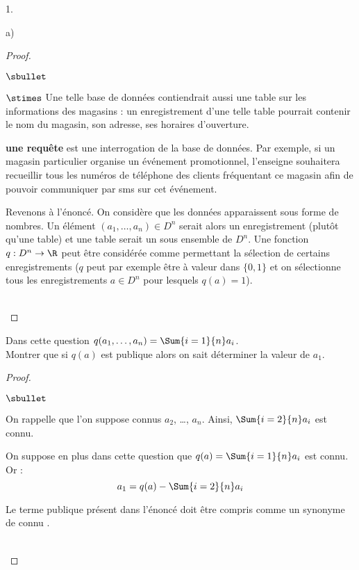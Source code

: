\documentclass[11pt]{article}%
\begin{document}
\begin{noliste}{1.}
\begin{noliste}{a)}
\begin{proof}
\begin{remark}
\begin{noliste}{$\sbullet$}
\begin{noliste}{$\stimes$}
            Une telle base de données contiendrait aussi une table sur
            les informations des magasins : un enregistrement d'une
            telle table pourrait contenir le nom du magasin, son
            adresse, ses horaires d'ouverture.
          \item {\bf une requête} est une interrogation de la base de
            données. Par exemple, si un magasin particulier organise un
            événement promotionnel, l'enseigne
            souhaitera recueillir tous les numéros de téléphone des
            clients fréquentant ce magasin afin de pouvoir
            communiquer par sms sur cet événement.
          \end{noliste}
        \item Revenons à l'énoncé. On considère que les données
          apparaissent sous forme de nombres. Un élément $(a_1,
          \ldots, a_n) \in D^n$ serait alors un enregistrement (plutôt
          qu'une table) et une table serait un sous ensemble de
          $D^n$. Une fonction $q : D^n \to \R$ peut être considérée
          comme permettant la sélection de certains enregistrements
          ($q$ peut par exemple être à valeur dans $\{0, 1\}$ et on
          sélectionne tous les enregistrements $a \in D^n$ pour
          lesquels $q(a) = 1$).
        \end{noliste}
      \end{remark}~\\[-1.4cm]
    \end{proof}


    \newpage


  \item Dans cette question $q(a_1,\ldots,a_n) = \Sum{i=1}{n} a_i$.\\
    Montrer que si $q(a)$ est publique alors on sait déterminer la
    valeur de $a_1$.

    \begin{proof}~%
      \begin{noliste}{$\sbullet$}
      \item On rappelle que l'on suppose connus $a_2$, \ldots,
        $a_n$. Ainsi, $\Sum{i=2}{n} a_i$ est connu.

      \item On suppose en plus dans cette question que $q(a) =
        \Sum{i=1}{n} a_i$ est connu. Or :
        \[
        a_1 = q(a) - \Sum{i=2}{n} a_i
        \]        
      \end{noliste}
      \begin{remark}
        Le terme \og publique \fg{} présent dans l'énoncé doit être
        compris comme un synonyme de \og connu \fg{}.
      \end{remark}~\\[-1cm]
    \end{proof}
  \end{noliste}
\end{noliste}
\end{document}
